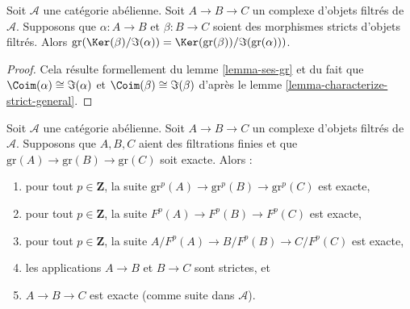 \begin{lemma}
\label{lemma-filtered-complex}
Soit $\mathcal{A}$ une catégorie abélienne. Soit $A \to B \to C$ un complexe
d'objets filtrés de $\mathcal{A}$. Supposons que $\alpha : A \to B$ et
$\beta : B \to C$ soient des morphismes stricts d'objets filtrés. Alors
$\text{gr}(\Ker(\beta)/\Im(\alpha)) =
\Ker(\text{gr}(\beta))/\Im(\text{gr}(\alpha)))$.
\end{lemma}

\begin{proof}
Cela résulte formellement du
lemme \ref{lemma-ses-gr}
et du fait que
$\Coim(\alpha) \cong \Im(\alpha)$ et
$\Coim(\beta) \cong \Im(\beta)$ d'après le
lemme \ref{lemma-characterize-strict-general}.
\end{proof}

\begin{lemma}
\label{lemma-filtered-acyclic}
Soit $\mathcal{A}$ une catégorie abélienne.
Soit $A \to B \to C$ un complexe d'objets filtrés de $\mathcal{A}$.
Supposons que $A, B, C$ aient des filtrations finies et que
$\text{gr}(A) \to \text{gr}(B) \to \text{gr}(C)$ soit exacte.
Alors :
\begin{enumerate}
\item pour tout $p \in \mathbf{Z}$, la suite
$\text{gr}^p(A) \to \text{gr}^p(B) \to \text{gr}^p(C)$ est exacte,
\item pour tout $p \in \mathbf{Z}$, la suite
$F^p(A) \to F^p(B) \to F^p(C)$ est exacte,
\item pour tout $p \in \mathbf{Z}$, la suite
$A/F^p(A) \to B/F^p(B) \to C/F^p(C)$ est exacte,
\item les applications $A \to B$ et $B \to C$ sont strictes, et
\item $A \to B \to C$ est exacte (comme suite dans $\mathcal{A}$).
\end{enumerate}
\end{lemma}

